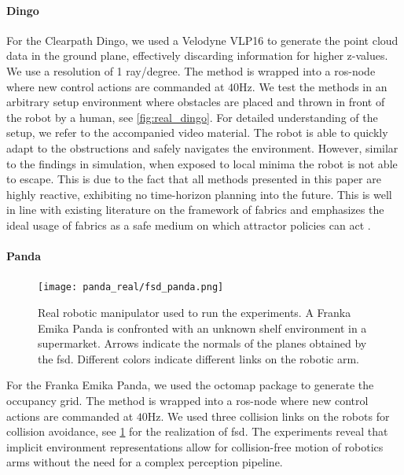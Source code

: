 \paragraph{Dingo}
For the Clearpath Dingo, we used a Velodyne
VLP16 to generate the point cloud data in the ground plane,
effectively discarding information for higher z-values. We
use a resolution of 1 ray/degree. The method is wrapped into
a ros-node where new control actions are commanded at
$40$Hz. We test the methods in an
arbitrary setup environment where obstacles are placed and
thrown in front of the robot by a human, see
\cref{fig:real_dingo}. For detailed understanding of
the setup, we refer to the accompanied video material. The
robot is able to quickly adapt to the obstructions and
safely navigates the environment. However, similar to the
findings in simulation, when exposed to local minima the
robot is not able to escape. This is due to the fact that
all methods presented in this paper are highly reactive, exhibiting
no time-horizon planning into the future. This is well in line with
existing literature on the framework of \ac{fabrics} and
emphasizes the ideal usage of \ac{fabrics} as a safe
medium on which attractor policies can act \cite{wyk2024geometric}.

\paragraph{Panda}
%
\begin{figure}[ht]
  \texttt{[image: panda\_real/fsd\_panda.png]}
  \caption{Real robotic manipulator used to run the experiments. A
    Franka Emika Panda is confronted with an unknown shelf
    environment in a supermarket. Arrows indicate the
    normals of the planes obtained by the \ac{fsd}.
    Different colors indicate different links on the robotic
    arm.
  }
  \label{fig:real_panda}
\end{figure}
%
For the Franka Emika Panda, we used the octomap package to
generate the occupancy grid. The method is wrapped into a
ros-node where new control actions are commanded at $40$Hz.
We used three collision links on the robots for collision
avoidance, see \cref{fig:real_panda} for the realization of
\ac{fsd}. The experiments reveal that implicit environment
representations allow for collision-free motion of robotics
arms without the need for a complex perception pipeline.

